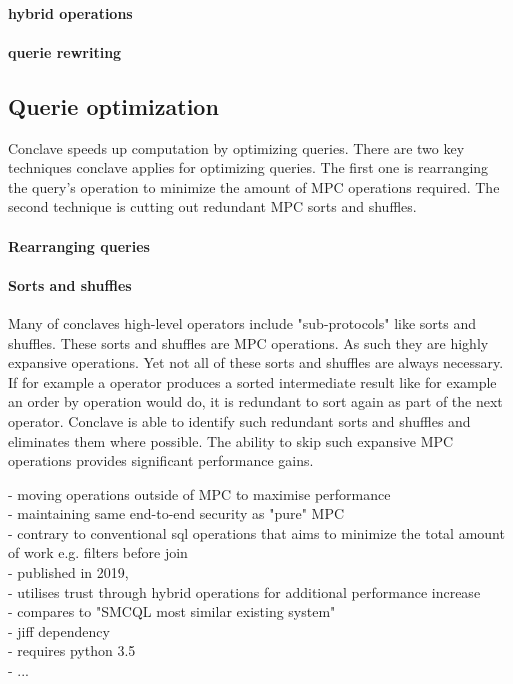 \paragraph{hybrid operations}
\paragraph{querie rewriting}

\subsection{Querie optimization}
Conclave speeds up computation by optimizing queries. There are two key techniques conclave applies for optimizing queries. The first one is rearranging the query's operation to minimize the amount of MPC operations required. The second technique is cutting out redundant MPC sorts and shuffles.  \paragraph{Rearranging queries} 
\paragraph{Sorts and shuffles}
Many of conclaves high-level operators include "sub-protocols" like sorts and shuffles. These sorts and shuffles are MPC operations. As such they are highly expansive operations. Yet not all of these sorts and shuffles are always necessary. If for example a operator produces a sorted intermediate result like for example an order by operation would do, it is redundant to sort again as part of the next operator. Conclave is able to identify such redundant sorts and shuffles and eliminates them where possible. The ability to skip such expansive MPC operations provides significant performance gains.


- moving operations outside of MPC to maximise performance\\
- maintaining same end-to-end security as "pure" MPC     \\
- contrary to conventional sql operations that aims to minimize the total amount of work e.g. filters before join \\

- published in 2019,\\
- utilises trust through hybrid operations for additional performance increase \\
- compares to "SMCQL most similar existing system"\\
- jiff dependency \\
- requires python 3.5 \\
- ...